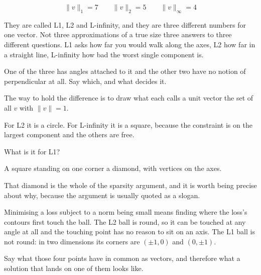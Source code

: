 \begin{fr}
\begin{ansblock}
\[ \lVert v \rVert_1 = 7 \qquad \lVert v \rVert_2 = 5 \qquad
   \lVert v \rVert_\infty = 4 \]
\end{ansblock}

They are called L1, L2 and L-infinity, and they are three different numbers for
one vector. Not three approximations of a true size \dash{} three answers to
three different questions. L1 asks how far you would walk along the axes, L2
how far in a straight line, L-infinity how bad the worst single component is.

One of the three has angles attached to it and the other two have no notion of
perpendicular at all. Say which, and what decides it.
\dotline
\nextframe
\end{fr}

\begin{fr}
The way to hold the difference is to draw what each calls a unit vector \dash{}
the set of all $v$ with $\lVert v \rVert = 1$.

For L2 it is a circle. For L-infinity it is a square, because the constraint is
on the largest component and the others are free.

What is it for L1?
\nextframe
\end{fr}

\begin{fr}
\begin{ansblock}
A square standing on one corner \dash{} a diamond, with vertices on the axes.
\end{ansblock}

That diamond is the whole of the sparsity argument, and it is worth being
precise about why, because the argument is usually quoted as a slogan.

Minimising a loss subject to a norm being small means finding where the loss's
contours first touch the ball. The L2 ball is round, so it can be touched at
any angle at all and the touching point has no reason to sit on an axis. The L1
ball is not round: in two dimensions its corners are $(\pm 1, 0)$ and
$(0, \pm 1)$.

Say what those four points have in common as vectors, and therefore what a
solution that lands on one of them looks like.
\dotline
\nextframe
\end{fr}

